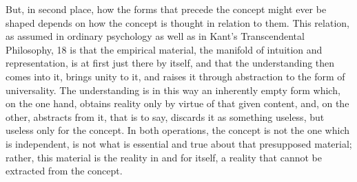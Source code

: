 But, in second place, how the forms that precede the concept might
ever be shaped depends on how the concept is thought in relation to them.
This relation, as assumed in ordinary psychology as well as in Kant's
Transcendental Philosophy, 18 is that the empirical material, the manifold
of intuition and representation, is at first just there by itself, and that the
understanding then comes into it, brings unity to it, and raises it through
abstraction to the form of universality. The understanding is in this way
an inherently empty form which, on the one hand, obtains reality only by
virtue of that given content, and, on the other, abstracts from it, that is
to say, discards it as something useless, but useless only for the concept.
In both operations, the concept is not the one which is independent, is
not what is essential and true about that presupposed material; rather, this
material is the reality in and for itself, a reality that cannot be extracted
from the concept.

